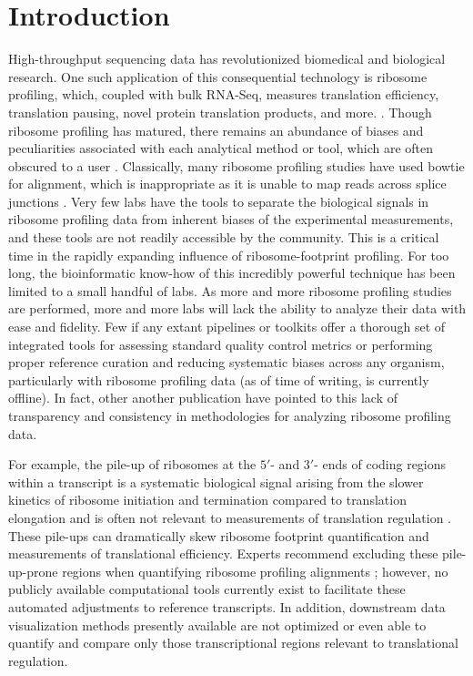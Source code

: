 \documentclass[10pt, oneside]{article}
\begin{document}
\section*{Introduction}
High-throughput sequencing data has revolutionized biomedical and biological research. One such application of this consequential technology is ribosome profiling, which, coupled with bulk RNA-Seq, measures translation efficiency, translation pausing, novel protein translation products, and more. \cite{ingolia_science, riboseq_overview, ingolia_meth}. Though ribosome profiling has matured, there remains an abundance of biases and peculiarities associated with each analytical method or tool, which are often obscured to a user \cite{gerashchenko_nar, analysis_biases, riboseq_biases, riboseq_biases2, riboseq_biases3}. Classically, many ribosome profiling studies have used bowtie \cite{bowtie} for alignment, which is inappropriate as it is unable to map reads across splice junctions \cite{analysis_biases}. Very few labs have the tools to separate the biological signals in ribosome profiling data from inherent biases of the experimental measurements, and these tools are not readily accessible by the community. This is a critical time in the rapidly expanding influence of ribosome-footprint profiling. For too long, the bioinformatic know-how of this incredibly powerful technique has been limited to a small handful of labs. As more and more ribosome profiling studies are performed, more and more labs will lack the ability to analyze their data with ease and fidelity. Few if any extant pipelines or toolkits offer a thorough set of integrated tools for assessing standard quality control metrics or performing proper reference curation and reducing systematic biases across any organism, particularly with ribosome profiling data \cite{galaxy, ribogalaxy, nextflow_pipeline, dnanexus_pipeline, riboviz} (as of time of writing, \cite{ribogalaxy} is currently offline). In fact, other another publication \cite{pausepred} have pointed to this lack of transparency and consistency in methodologies for analyzing ribosome profiling data.\par

For example, the pile-up of ribosomes at the $5'$- and $3'$- ends of coding regions within a transcript is a systematic biological signal arising from the slower kinetics of ribosome initiation and termination compared to translation elongation and is often not relevant to measurements of translation regulation \cite{gerashchenko_nar, artieri_gr, hussman_plosg}. These pile-ups can dramatically skew ribosome footprint quantification and measurements of translational efficiency. Experts recommend excluding these pile-up-prone regions when quantifying ribosome profiling alignments \cite{ingolia_meth, weinberg_reports}; however, no publicly available computational tools currently exist to facilitate these automated adjustments to reference transcripts. In addition, downstream data visualization methods presently available are not optimized or even able to quantify and compare only those transcriptional regions relevant to translational regulation. \par
\end{document}
